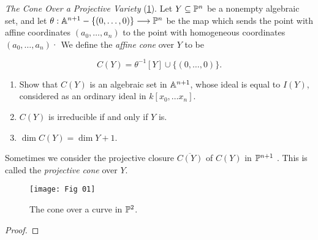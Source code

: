 \label{1.2.10}

\textit{The Cone Over a Projective Variety} (\ref{Fig. 1}). Let $Y \subseteq \P^n$ be a nonempty algebraic set, and let $\theta :\A^{n + 1} -
\{(0, \dots ,0)\} \longrightarrow \P^n$ be the map which sends the point with affine coordinates $(a_0, \dots, a_n)$ to the point with homogeneous coordinates $(a_0 , \dots ,a_n)$· We define the \textit{affine cone} over $Y$ to be

\[
    C(Y) = \theta^{- 1}[Y] \cup \{(0, \dots ,0)\}.
\]

\begin{enumerate}[label = (\alph*)]
    \item Show that $C(Y)$ is an algebraic set in $\A^{n + 1}$, whose ideal is equal to $I(Y)$, considered as an ordinary ideal in $k[x_0 , \dots x_n]$.
    
    \item $C(Y)$ is irreducible if and only if $Y$ is.
    
    \item $\dim C(Y) = \dim Y + 1$.
\end{enumerate}

Sometimes we consider the projective closure $\overline{C(Y)}$ of $C(Y)$ in $\P^{n + 1}$ . This is called the \textit{projective cone} over $Y$.

\newpage

\begin{figure}
    \centering
    \texttt{[image: Fig 01]}
    \caption{The cone over a curve in $\P^2$.}
    \label{Fig. 1}
\end{figure}

\begin{proof}
    
\end{proof}